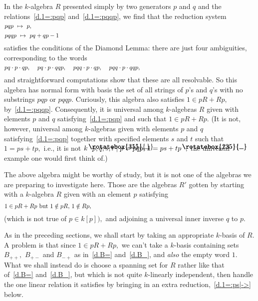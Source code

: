 \documentclass{amsart}
\DeclareRobustCommand{\lang}{\begin{picture}(5,7)
\put(1.2,2.5){\rotatebox{45}{\line(1,0){6.0}}}
\put(1.2,2.5){\rotatebox{315}{\line(1,0){6.0}}}
\end{picture}\kern.16em}
\DeclareRobustCommand{\rang}{\kern.1em\begin{picture}(5,7)
\put(.1,2.5){\rotatebox{135}{\line(1,0){6.0}}}
\put(.1,2.5){\rotatebox{225}{\line(1,0){6.0}}}
\end{picture}}
\begin{document}
In the $\!k\!$-algebra $R$ presented
simply by two generators $p$ and $q$ and the
relations~\eqref{d.1=:pqp} and~\eqref{d.1=:pqqp}, we
find that the reduction system
\begin{equation}\begin{minipage}[c]{35pc}\label{d.1=:pqp|->}
$pqp\ \mapsto\ p,$
\end{minipage}\end{equation}
\begin{equation}\begin{minipage}[c]{35pc}\label{d.1=:pqqp|->}
$pqqp\ \mapsto\ pq+qp-1$
\end{minipage}\end{equation}
satisfies the conditions of the Diamond Lemma: there are just four
ambiguities, corresponding to the words
\begin{equation}\begin{minipage}[c]{35pc}\label{d.1=:pq_only}
$pq\cdot p\cdot qp,$ \quad
$pq\cdot p\cdot qqp,$ \quad
$pqq\cdot p\cdot qp,$ \quad
$pqq\cdot p\cdot qqp,$
\end{minipage}\end{equation}
and straightforward computations show that these are all resolvable.
So this algebra has normal form with basis the set of all strings of
$\!p\!$'s and $\!q\!$'s with no substrings $pqp$ or $pqqp.$
Curiously, this algebra also satisfies $1\in pR+Rp,$
by~\eqref{d.1=:pqqp}.
Consequently, it is universal among $\!k\!$-algebras $R$
given with elements $p$ and $q$ satisfying~\eqref{d.1=:pqp}
and such that $1\in pR+Rp.$
(It is not, however, universal among $\!k\!$-algebras given
with elements $p$ and $q$ satisfying~\eqref{d.1=:pqp}
together with specified elements $s$ and $t$ such that $1=ps+tp,$
i.e., it is not $k\lang p, q, s, t\mid p=pqp,\,1=ps+tp\rang,$
the universal example one would first think of.)

The above algebra might be worthy of study,
but it is not one of the algebras we are preparing to investigate here.
Those are the algebras $R'$ gotten by starting with a $\!k\!$-algebra
$R$ given with an element $p$ satisfying
\begin{equation}\begin{minipage}[c]{35pc}\label{d.1=_but}
$1\in pR+Rp$ but $1\notin pR,$ $1\notin Rp,$
\end{minipage}\end{equation}
(which is not true of $p\in k[p]),$
and adjoining a universal inner inverse $q$ to $p.$

As in the preceding sections, we shall start by taking an
appropriate $\!k\!$-basis of $R.$
A problem is that since $1\in pR+Rp,$ we can't take a $\!k\!$-basis
containing sets $B_{++},$ $B_{+-}$ and $B_{-+}$ as
in~\eqref{d.B=} and~\eqref{d.B_},
and {\em also} the empty word $1.$
What we shall instead do is choose a spanning set for $R$
rather like that of~\eqref{d.B=} and~\eqref{d.B_}, but
which is not quite $\!k\!$-linearly independent,
then handle the one linear relation it satisfies by bringing in
an extra reduction,~\eqref{d.1=:ps|->} below.
\end{document}
